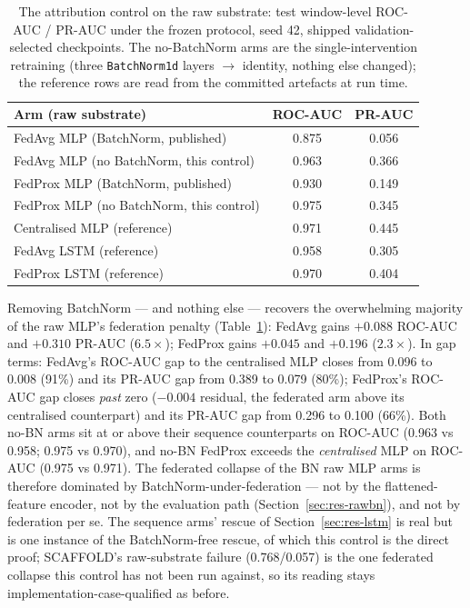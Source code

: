 \begin{table}[t]
\centering
\caption{The attribution control on the raw substrate: test
window-level ROC-AUC / PR-AUC under the frozen protocol, seed 42,
shipped validation-selected checkpoints. The no-BatchNorm arms are
the single-intervention retraining (three \texttt{BatchNorm1d}
layers $\to$ identity, nothing else changed); the reference rows are
read from the committed artefacts at run time.}
\label{tab:rawnobn}
\small
\begin{tabular}{@{}l c c@{}}
\toprule
\textbf{Arm (raw substrate)} & \textbf{ROC-AUC} & \textbf{PR-AUC} \\
\midrule
FedAvg MLP (BatchNorm, published) & 0.875 & 0.056 \\
FedAvg MLP (no BatchNorm, this control) & 0.963 & 0.366 \\
FedProx MLP (BatchNorm, published) & 0.930 & 0.149 \\
FedProx MLP (no BatchNorm, this control) & 0.975 & 0.345 \\
\midrule
Centralised MLP (reference) & 0.971 & 0.445 \\
FedAvg LSTM (reference) & 0.958 & 0.305 \\
FedProx LSTM (reference) & 0.970 & 0.404 \\
\bottomrule
\end{tabular}
\end{table}

Removing BatchNorm --- and nothing else --- recovers the overwhelming
majority of the raw MLP's federation penalty
(Table~\ref{tab:rawnobn}): FedAvg gains $+0.088$ ROC-AUC and
$+0.310$ PR-AUC ($6.5\times$); FedProx gains $+0.045$ and $+0.196$
($2.3\times$). In gap terms: FedAvg's ROC-AUC gap to the centralised
MLP closes from 0.096 to 0.008 (91\%) and its PR-AUC gap from 0.389
to 0.079 (80\%); FedProx's ROC-AUC gap closes \emph{past} zero
($-0.004$ residual, the federated arm above its centralised
counterpart) and its PR-AUC gap from 0.296 to 0.100 (66\%). Both
no-BN arms sit at or above their sequence counterparts on ROC-AUC
(0.963 vs 0.958; 0.975 vs 0.970), and no-BN FedProx exceeds the
\emph{centralised} MLP on ROC-AUC (0.975 vs 0.971). The federated
collapse of the BN raw MLP arms is therefore dominated by
BatchNorm-under-federation --- not by the flattened-feature encoder,
not by the evaluation path (Section~\ref{sec:res-rawbn}), and not by
federation per se. The sequence arms' rescue of
Section~\ref{sec:res-lstm} is real but is one instance of the
BatchNorm-free rescue, of which this control is the direct proof;
SCAFFOLD's raw-substrate failure (0.768/0.057) is the one federated
collapse this control has not been run against, so its reading stays
implementation-case-qualified as before.

